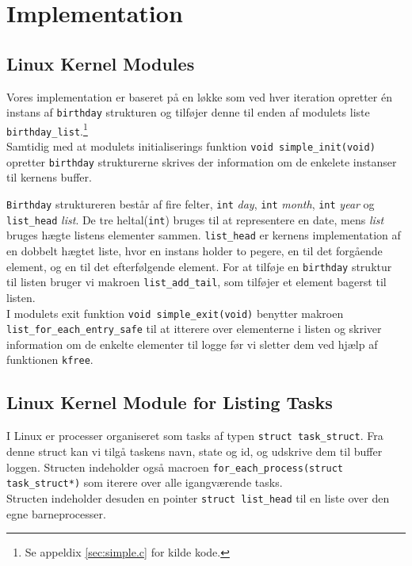 \documentclass[main.tex]{subfile}
\begin{document}
\section{Implementation}
\subsection{Linux Kernel Modules}
Vores implementation er baseret på en løkke som ved hver iteration opretter én instans af \texttt{birthday} strukturen og tilføjer denne til enden af modulets liste \texttt{birthday\_list}.\footnote{Se appeldix \ref{sec:simple.c} for kilde kode.}\\

Samtidig med at modulets initialiserings funktion \texttt{void simple\_init(void)} opretter \texttt{birthday} strukturerne skrives der information om de enkelete instanser til kernens buffer. 

\texttt{Birthday} struktureren består af fire felter, \texttt{int} \emph{day}, \texttt{int} \emph{month}, \texttt{int} \emph{year} og \texttt{list\_head} \emph{list}. De tre heltal(\texttt{int}) bruges til at representere en date, mens \emph{list} bruges hægte listens elementer sammen. \texttt{list\_head} er kernens implementation af en dobbelt hægtet liste, hvor en instans holder to pegere, en til det forgående element, og en til det efterfølgende element. For at tilføje en \texttt{birthday} struktur til listen bruger vi makroen \texttt{list\_add\_tail}, som tilføjer et element bagerst til listen.\\

I modulets exit funktion \texttt{void simple\_exit(void)} benytter makroen \texttt{list\_for\_each\_entry\_safe} til at itterere over elementerne i listen og skriver information om de enkelte elementer til logge før vi sletter dem ved hjælp af funktionen \texttt{kfree}. 

\subsection{Linux Kernel Module for Listing Tasks}
I Linux er processer organiseret som tasks af typen \texttt{struct task\_struct}. Fra denne struct kan vi tilgå taskens navn, state og id, og udskrive dem til buffer loggen. Structen indeholder også macroen \texttt{for\_each\_process(struct task\_struct*)} som iterere over alle igangværende tasks.\\

Structen indeholder desuden en pointer \texttt{struct list\_head} til en liste over den egne barneprocesser.\\
\end{document}
